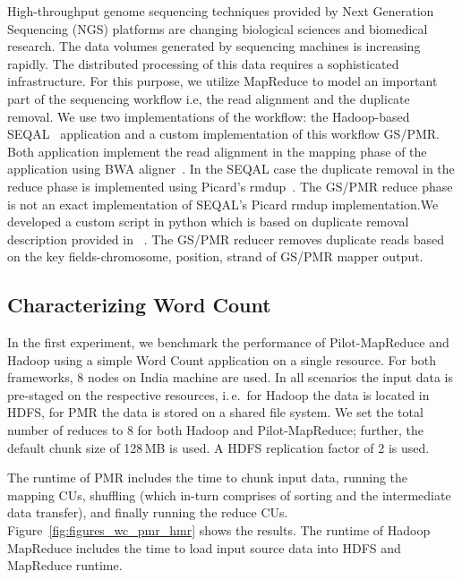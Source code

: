 \documentclass{acm_proc_article-sp}
\newcommand{\upp}{\vspace*{-0.5em}}
\newcommand{\pilotmapreduce}{Pilot-MapReduce\xspace}
\begin{document}
High-throughput genome sequencing techniques provided by Next Generation
Sequencing (NGS) platforms are changing biological sciences and biomedical
research. The data volumes generated by sequencing machines is increasing
rapidly. The distributed processing of this data requires a sophisticated
infrastructure. For this purpose, we utilize MapReduce to model an important
part of the sequencing workflow i.e, the read alignment and the duplicate
removal. We use two implementations of the workflow: the Hadoop-based 
SEQAL~\cite{seal-2011} application and a custom implementation of this workflow 
GS/PMR. Both application implement the read alignment in the mapping phase of 
the application using BWA aligner~\cite{Li:2010:FAL:1741823.1741825}. In the 
SEQAL case the duplicate removal in the reduce phase is implemented using  
Picard's rmdup~\cite{picard}. The GS/PMR reduce phase is not an exact implementation of
SEQAL's Picard rmdup implementation.We developed a custom script in python
which is based on duplicate removal description provided in ~\cite{seal-2011}. 
The GS/PMR reducer removes duplicate reads based on the key fields-chromosome,
position, strand of GS/PMR mapper output.

\upp
\subsection{Characterizing Word Count}


In the first experiment, we benchmark the performance of
\pilotmapreduce and Hadoop using a simple Word Count application on a
single resource. For both frameworks, 8 nodes on India machine are
used. In all scenarios the input data is pre-staged on the respective
resources, i.\,e.\ for Hadoop the data is located in HDFS, for PMR the
data is stored on a shared file system. We set the total number of
reduces to 8 for both Hadoop and \pilotmapreduce; further, the default
chunk size of 128\,MB is used. A HDFS replication factor of 2 is used.

The runtime of PMR includes the time to chunk input data, running the
mapping CUs, shuffling (which in-turn comprises of sorting and the
intermediate data transfer), and finally running the reduce CUs.
Figure~\ref{fig:figures_wc_pmr_hmr} shows the results. The runtime of
Hadoop MapReduce includes the time to load input source data into HDFS and
MapReduce runtime.
\end{document}
